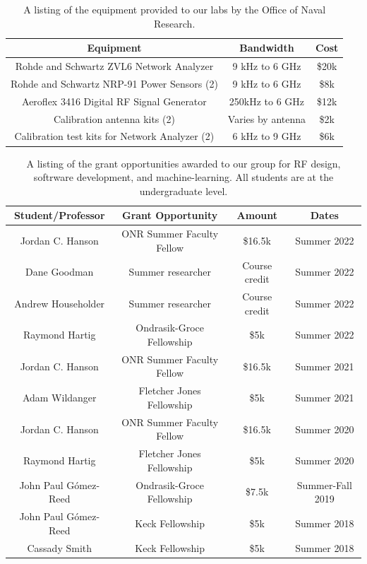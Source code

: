 \documentclass[../../main.tex]{subfiles}
\begin{document}
\begin{table}
\centering
\begin{tabular}{c c c}
Equipment & Bandwidth & Cost \\ \hline
Rohde and Schwartz ZVL6 Network Analyzer & 9 kHz to 6 GHz & \$20k \\
Rohde and Schwartz NRP-91 Power Sensors (2) & 9 kHz to 6 GHz & \$8k \\
Aeroflex 3416 Digital RF Signal Generator & 250kHz to 6 GHz & \$12k \\
Calibration antenna kits (2) & Varies by antenna & \$2k \\
Calibration test kits for Network Analyzer (2) & 6 kHz to 9 GHz & \$6k
\end{tabular}
\caption{\label{tab:equip} A listing of the equipment provided to our labs by the Office of Naval Research.}
\end{table}

\begin{table}
\centering
\begin{tabular}{c c c c}
Student/Professor & Grant Opportunity & Amount & Dates \\ \hline
Jordan C. Hanson & ONR Summer Faculty Fellow & \$16.5k & Summer 2022 \\
Dane Goodman & Summer researcher & Course credit & Summer 2022 \\
Andrew Householder & Summer researcher & Course credit & Summer 2022 \\
Raymond Hartig & Ondrasik-Groce Fellowship & \$5k & Summer 2022 \\
Jordan C. Hanson & ONR Summer Faculty Fellow & \$16.5k & Summer 2021 \\
Adam Wildanger & Fletcher Jones Fellowship & \$5k & Summer 2021 \\
Jordan C. Hanson & ONR Summer Faculty Fellow & \$16.5k & Summer 2020 \\
Raymond Hartig & Fletcher Jones Fellowship & \$5k & Summer 2020 \\
John Paul G\'{o}mez-Reed & Ondrasik-Groce Fellowship & \$7.5k & Summer-Fall 2019 \\
John Paul G\'{o}mez-Reed & Keck Fellowship & \$5k & Summer 2018 \\
Cassady Smith & Keck Fellowship & \$5k & Summer 2018 \\
\end{tabular}
\caption{\label{tab:funds} A listing of the grant opportunities awarded to our group for RF design, softrware development, and machine-learning.  All students are at the undergraduate level.}
\end{table}
\end{document}
